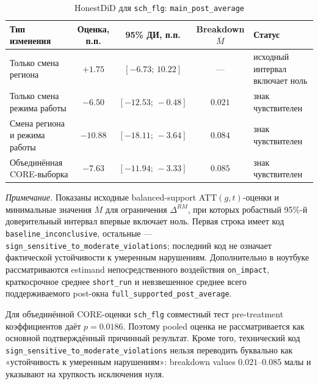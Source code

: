 \documentclass[14pt,a4paper]{extarticle}
\begin{document}
\begin{table}[H]
\centering
\caption{HonestDiD для \texttt{sch\_flg}: \texttt{main\_post\_average}}
\label{tab:honestdid_sch_main}
\footnotesize
\setlength{\tabcolsep}{3pt}
\renewcommand{\arraystretch}{1.12}
\begin{tabularx}{\textwidth}{@{}>{\raggedright\arraybackslash}X c c c >{\raggedright\arraybackslash}X@{}}
\toprule
Тип изменения & Оценка, п.п. & 95\% ДИ, п.п. & Breakdown \(\overline{M}\) & Статус \\
\midrule
Только смена региона & \(+1.75\) & \([-6.73;\,10.22]\) & --- & исходный интервал включает ноль \\
Только смена режима работы & \(-6.50\) & \([-12.53;\,-0.48]\) & \(0.021\) & знак чувствителен \\
Смена региона и режима работы & \(-10.88\) & \([-18.11;\,-3.64]\) & \(0.084\) & знак чувствителен \\
Объединённая CORE-выборка & \(-7.63\) & \([-11.94;\,-3.33]\) & \(0.085\) & знак чувствителен \\
\bottomrule
\end{tabularx}
\begin{minipage}{0.98\textwidth}
\scriptsize
\textit{Примечание.} Показаны исходные balanced-support ATT\((g,t)\)-оценки и
минимальные значения \(\overline{M}\) для ограничения \(\Delta^{RM}\), при
которых робастный 95\%-й доверительный интервал впервые включает ноль. Первая
строка имеет код \texttt{baseline\_\allowbreak inconclusive}, остальные ---
\texttt{sign\_\allowbreak sensitive\_\allowbreak to\_\allowbreak moderate\_\allowbreak violations}; последний код не означает
фактической устойчивости к умеренным нарушениям. Дополнительно в ноутбуке
рассматриваются estimand непосредственного воздействия
\texttt{on\_impact}, краткосрочное среднее \texttt{short\_run} и невзвешенное
среднее всего поддерживаемого post-окна
\texttt{full\_supported\_post\_average}.
\end{minipage}
\end{table}

Для объединённой CORE-оценки \texttt{sch\_flg} совместный тест pre-treatment коэффициентов даёт \(p=0.0186\). Поэтому pooled оценка не рассматривается как основной подтверждённый причинный результат. Кроме того, технический код \texttt{sign\_\allowbreak sensitive\_\allowbreak to\_\allowbreak moderate\_\allowbreak violations} нельзя переводить буквально как «устойчивость к умеренным нарушениям»: breakdown values \(0.021\)--\(0.085\) малы и указывают на хрупкость исключения нуля.
\end{document}
